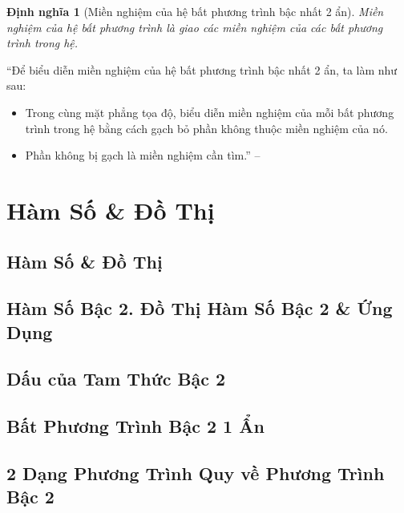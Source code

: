 \documentclass[oneside]{book}
\numberwithin{equation}{section}
\newtheorem{dinhnghia}{Định nghĩa}[section]
\begin{document}
\begin{dinhnghia}[Miền nghiệm của hệ bất phương trình bậc nhất 2 ẩn]
	\emph{Miền nghiệm} của hệ bất phương trình là giao các miền nghiệm của các bất phương trình trong hệ.
\end{dinhnghia}

\begin{tcolorbox}
	``Để biểu diễn miền nghiệm của hệ bất phương trình bậc nhất 2 ẩn, ta làm như sau:
	\begin{itemize}
		\item Trong cùng mặt phẳng tọa độ, biểu diễn miền nghiệm của mỗi bất phương trình trong hệ bằng cách gạch bỏ phần không thuộc miền nghiệm của nó.
		\item Phần không bị gạch là miền nghiệm cần tìm.'' --\cite[p. 27]{SGK_Toan_10_Canh_Dieu_tap_1}
	\end{itemize}
\end{tcolorbox}


\chapter{Hàm Số \& Đồ Thị}

\section{Hàm Số \& Đồ Thị}

\section{Hàm Số Bậc 2. Đồ Thị Hàm Số Bậc 2 \& Ứng Dụng}

\section{Dấu của Tam Thức Bậc 2}

\section{Bất Phương Trình Bậc 2 1 Ẩn}

\section{2 Dạng Phương Trình Quy về Phương Trình Bậc 2}

\end{document}
